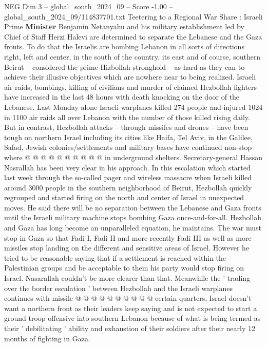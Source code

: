 \begin{textsample}{NEG Dim 3 – global\_south\_2024\_09 – Score -1.00 – global\_south\_2024\_09/114837701.txt}  \label{ex:f3_neg_122}
Teetering to a Regional War Share : Israeli Prime \textbf{Minister} Benjamin Netanyahu and his military establishment led by Chief of Staff Herzi Halevi are determined to separate the Lebanese and the Gaza fronts.
To do that the Israelis are bombing Lebanon in all sorts of directions right, left and center, in the south of the country, its east and of course, southern Beirut -- considered the prime Hizbollah stronghold -- as hard as they can to achieve their illusive objectives which are nowhere near to being realized.
Israeli air raids, bombings, killing of civilians and murder of claimed Hezbollah fighters have increased in the last 48 hours with death knocking on the door of the Lebanese.
Last Monday alone Israeli warplanes killed 274 people and injured 1024 in 1100 air raids all over Lebanon with the number of those killed rising daily.
But in contrast, Hezbollah attacks -- through missiles and drones -- have been tough on northern Israel including its cities like Haifa, Tel Aviv, in the Galilee, Safad, Jewish colonies/settlements and military bases have continued non-stop where @ @ @ @ @ @ @ @ @ @ in underground shelters.
Secretary-general Hassan Nasrallah has been very clear in his approach.
In this escalation which started last week through the so-called pager and wireless massacre when Israeli killed around 3000 people in the southern neighborhood of Beirut, Hezbollah quickly regrouped and started firing on the north and center of Israel in unexpected moves.
He said there will be no separation between the Lebanese and Gaza fronts until the Israeli military machine stops bombing Gaza once-and-for-all.
Hezbollah and Gaza has long become an unparalleled equation, he maintains.
The war must stop in Gaza so that Fadi I, Fadi II and more recently Fadi III as well as more missiles stop landing on the different and sensitive areas of Israel.
However he tried to be reasonable saying that if a settlement is reached within the Palestinian groups and be acceptable to them his party would stop firing on Israel.
Nasarallah couldn't be more clearer than that.
Meanwhile the ' trading over the border escalation ' between Hezbollah and the Israeli warplanes continues with missile @ @ @ @ @ @ @ @ @ @ certain quarters, Israel doesn't want a northern front as their leaders keep saying and is not expected to start a ground troop offensive into southern Lebanon because of what is being termed as their ' debilitating ' ability and exhaustion of their soldiers after their nearly 12 months of fighting in Gaza.

\end{textsample}
